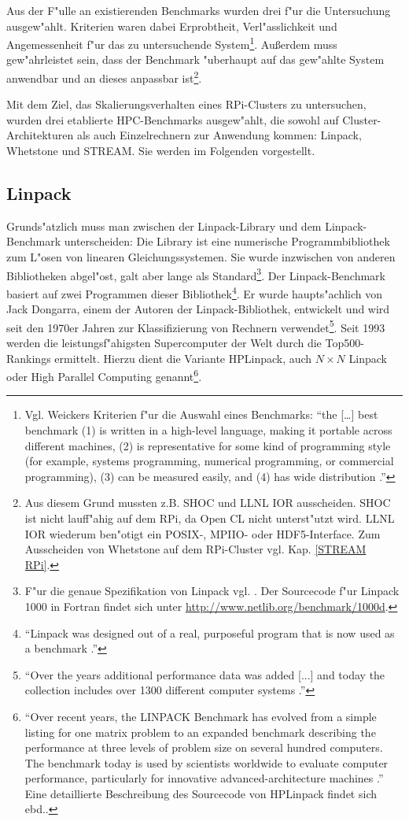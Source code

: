 Aus der F"ulle an existierenden Benchmarks wurden drei f"ur die Untersuchung ausgew"ahlt. Kriterien waren dabei Erprobtheit, Verl"asslichkeit und Angemessenheit f"ur das zu untersuchende System\footnote{Vgl. Weickers Kriterien f"ur die Auswahl eines Benchmarks: "`the [\dots] best benchmark (1) is written in a high-level language, making it portable across different machines, (2) is representative for some kind of programming style (for example, systems programming, numerical programming, or commercial programming), (3) can be measured easily, and (4) has wide distribution \cite{wei90}."'}. Au\ss erdem muss gew"ahrleistet sein, dass der Benchmark "uberhaupt auf das gew"ahlte System anwendbar und an dieses anpassbar ist\footnote{Aus diesem Grund mussten z.B. SHOC und LLNL IOR ausscheiden. SHOC ist nicht lauff"ahig auf dem RPi, da Open CL nicht unterst"utzt wird. LLNL IOR wiederum ben"otigt ein POSIX-, MPIIO- oder HDF5-Interface. Zum Ausscheiden von Whetstone auf dem RPi-Cluster vgl. Kap. \ref{STREAM RPi}.}. 

Mit dem Ziel, das Skalierungsverhalten eines RPi-Clusters zu untersuchen, wurden drei etablierte HPC-Benchmarks ausgew"ahlt, die sowohl auf Cluster-Architekturen als auch Einzelrechnern zur Anwendung kommen: Linpack, Whetstone und STREAM. Sie werden im Folgenden vorgestellt. 

\subsection{Linpack}\label{Linpack}

Grunds"atzlich muss man zwischen der Linpack-Library und dem Linpack-Benchmark unterscheiden: Die Library ist eine numerische Programmbibliothek zum L"osen von linearen Gleichungssystemen. Sie wurde inzwischen von anderen Bibliotheken abgel"ost, galt aber lange als Standard\footnote{F"ur die genaue Spezifikation von Linpack vgl. \cite{don03}. Der Sourcecode f"ur Linpack 1000 in Fortran findet sich unter \url{http://www.netlib.org/benchmark/1000d}.}. Der Linpack-Benchmark basiert auf zwei Programmen dieser Bibliothek\footnote{"`Linpack was designed out of a real, purposeful program that is now used as a benchmark \cite{wei90}."'}. Er wurde haupts"achlich von Jack Dongarra, einem der Autoren der Linpack-Bibliothek, entwickelt und wird seit den 1970er Jahren zur Klassifizierung von Rechnern verwendet\footnote{"`Over the years additional performance data was added [...] and today the collection includes over 1300 different computer systems \cite{don03}."'}. Seit 1993 werden die leistungsf"ahigsten Supercomputer der Welt durch die Top500-Rankings ermittelt. Hierzu dient die Variante HPLinpack, auch $N\times N$ Linpack oder High Parallel Computing genannt\footnote{"`Over recent years, the LINPACK Benchmark has evolved from a simple listing for one matrix problem to an expanded benchmark describing the performance at three levels of problem size on several hundred computers. The benchmark today is used by scientists worldwide to evaluate computer performance, particularly for innovative advanced-architecture machines \cite{don03}."' Eine detaillierte Beschreibung des Sourcecode von HPLinpack findet sich ebd..}. 

